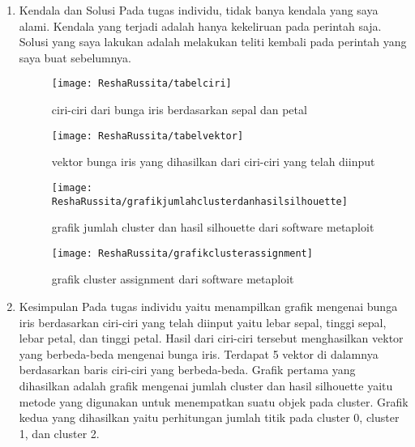 \begin{enumerate}
\item Kendala dan Solusi
\newline Pada tugas individu, tidak banya kendala yang saya alami. Kendala yang terjadi adalah hanya kekeliruan pada perintah saja. Solusi yang saya lakukan adalah melakukan teliti kembali pada perintah yang saya buat sebelumnya.

\begin{figure}[!ht]
\texttt{[image: ReshaRussita/tabelciri]}
\caption{ciri-ciri dari bunga iris berdasarkan sepal dan petal}
\label{gam:perkuliahan-23-09}
\end{figure}

\begin{figure}[!ht]
\texttt{[image: ReshaRussita/tabelvektor]}
\caption{vektor bunga iris yang dihasilkan dari ciri-ciri yang telah diinput}
\label{gam:perkuliahan-23-09}
\end{figure}

\begin{figure}[!ht]
\texttt{[image: ReshaRussita/grafikjumlahclusterdanhasilsilhouette]}
\caption{grafik jumlah cluster dan hasil silhouette dari software metaploit}
\label{gam:perkuliahan-23-09}
\end{figure}

\begin{figure}[!ht]
\texttt{[image: ReshaRussita/grafikclusterassignment]}
\caption{grafik cluster assignment dari software metaploit}
\label{gam:perkuliahan-23-09}
\end{figure}

\item Kesimpulan
\newline Pada tugas individu yaitu menampilkan grafik mengenai bunga iris berdasarkan ciri-ciri yang telah diinput yaitu lebar sepal, tinggi sepal, lebar petal, dan tinggi petal. Hasil dari ciri-ciri tersebut menghasilkan vektor yang berbeda-beda mengenai bunga iris. Terdapat 5 vektor di dalamnya berdasarkan baris ciri-ciri yang berbeda-beda. 
\newline Grafik pertama yang dihasilkan adalah grafik mengenai jumlah cluster dan hasil silhouette yaitu metode yang digunakan untuk menempatkan suatu objek pada cluster. 
\newline Grafik kedua yang dihasilkan yaitu perhitungan jumlah titik pada cluster 0, cluster 1, dan cluster 2. 

\end{enumerate}